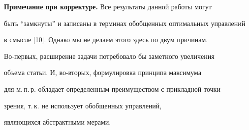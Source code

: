 {\bf Примечание при корректуре.} Все результаты данной работы могут


быть ``замкнуты'' и записаны в терминах обобщенных оптимальных управлений


в смысле [10]. Однако мы не делаем этого здесь по двум причинам.


Во-первых, расширение задачи потребовало бы заметного увеличения


объема статьи. И, во-вторых, формулировка принципа максимума


для м.\,п.\,р. обладает определенным преимуществом с прикладной точки


зрения, т.\,к. не использует обобщенных управлений,


являющихся абстрактными мерами.


 


